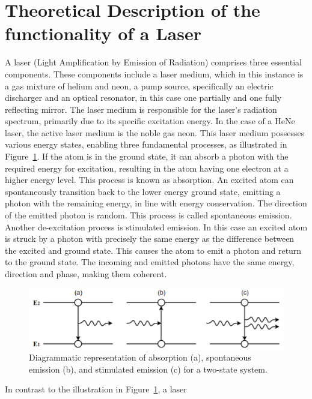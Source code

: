 \section{Theoretical Description of the functionality of a Laser}
\label{sec:theory}
\noindent
A laser (Light Amplification by Emission of Radiation) comprises
three essential components. These components include a laser medium, 
which in this instance is a gas mixture of helium and neon, a pump
source, specifically an electric discharger and an optical resonator, 
in this case one partially and one fully reflecting mirror.
\noindent
The laser medium is responsible for the laser's radiation spectrum, 
primarily due to its specific excitation energy. In the case 
of a HeNe laser, the active laser medium is the noble gas neon. 
This laser medium possesses various energy states, enabling three 
fundamental processes, as illustrated in Figure~\ref{fig:emission}.
\noindent
If the atom is in the ground state, it can absorb a photon with
the required energy for excitation, resulting in the atom having
one electron at a higher energy level. This process is known as 
absorption. An excited atom can spontaneously transition back 
to the lower energy ground state, emitting a photon with the remaining
energy, in line with energy conservation. The direction of the emitted
photon is random. This process is called spontaneous emission.
Another de-excitation process is stimulated emission. In this case
an excited atom is struck by a photon with precisely the same 
energy as the difference between the excited and ground state. 
This causes the atom to emit a photon and return to the ground state.
The incoming and emitted photons have the same energy, direction and 
phase, making them coherent.
\begin{figure}
    \centering
    \includegraphics[width=0.8\linewidth]{pictures/emission.png} %
    \caption{Diagrammatic representation of absorption (a), spontaneous emission (b), and stimulated emission (c) for a two-state system.~\cite{emission}}
    \label{fig:emission}
\end{figure}
\noindent
In contrast to the illustration in Figure~\ref{fig:emission}, a laser
